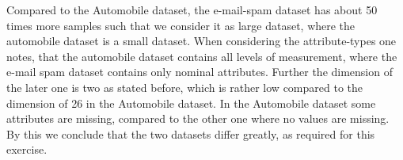 \documentclass[11pt]{article}
\begin{document}
%
Compared to the Automobile dataset, the e-mail-spam dataset has about 50 times more samples such that we consider it as large dataset, where the automobile dataset is a small dataset. When considering the attribute-types one notes, that the automobile dataset contains all levels of measurement, where the e-mail spam dataset contains only nominal attributes. Further the dimension of the later one is two as stated before, which is rather low compared to the dimension of 26 in the Automobile dataset. In the Automobile dataset some attributes are missing, compared to the other one where no values are missing.
By this we conclude that the two datasets differ greatly, as required for this exercise.
\newpage


\end{document}
